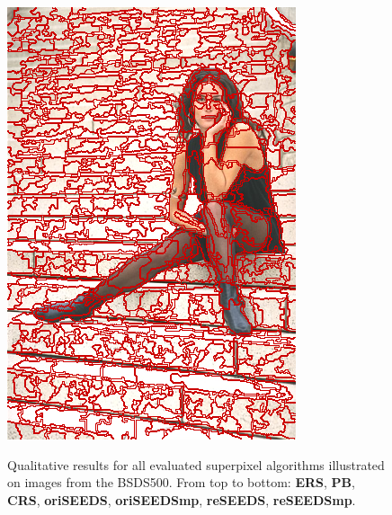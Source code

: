\begin{figure}
{		\includegraphics[scale=\scalefivebsdtest]{pictures/bsd-test-7-reseeds}
	}
	\caption[Qualitative results for \textbf{ERS} \cite{LiuTuzelRamalingamChellappa:2011}, \textbf{PB} \cite{ZhangHartleyMashfordBurn:2011}, \textbf{CRS} \cite{ConradMertzMester:2013} and different variants of \textbf{SEEDS} \cite{VanDenBerghBoixRoigCapitaniVanGool:2012} illustrated on images from the Berkeley Segmentation Dataset \cite{ArbelaezMaireFowlkesMalik:2011}.]{Qualitative results for all evaluated superpixel algorithms illustrated on images from the BSDS500. From top to bottom: \textbf{ERS}, \textbf{PB}, \textbf{CRS}, \textbf{oriSEEDS}, \textbf{oriSEEDSmp}, \textbf{reSEEDS}, \textbf{reSEEDSmp}.}
\end{figure}
